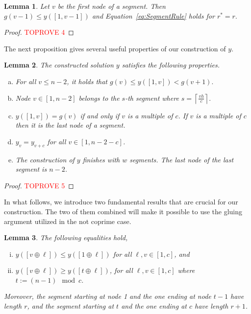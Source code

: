 \documentclass[11pt]{article}
\newtheorem{lemma}{Lemma}[section]
\newcommand\+{\mkern2mu}
\newcommand{\ceil}[1]{\left\lceil #1 \right\rceil}
\begin{document}
 \begin{lemma} Let $v$ be the first node of a segment. Then $g(v-1)\le y([1,v-1])$ and Equation~\eqref{eq:SegmentRule} holds for $r^*=r.$
 \end{lemma}
 \begin{proof}\textcolor{red}{TOPROVE 4}\end{proof}
 
 
 The next proposition gives several useful properties of our construction of $y$. 

 \begin{lemma}    
    The constructed solution $y$ satisfies the following properties.
    \begin{enumerate}[a)]
        \item For all $v \leq  n-2$, it holds that $g(v) \leq y([1,v]) < g(v+1).$ \label{it:a}
         \item Node $v\in [1,n-2]$ belongs to the $s$-th segment where 
          $s=\ceil{\frac{vh}{c}}.$ \label{it:b}
        \item $y([1, v]) = g(v)$ if and only if $v$ is a multiple of $c$. If $v$ is a multiple of $c$ then it is the last node of a segment.\label{it:c}
        \item $y_v=y_{v+c}$ for all $v\in [1,n-2-c]$. \label{it:d}
        \item The construction of $y$ finishes with $w$ segments. The last node of the last segment is $n-2$. \label{it:e}
    \end{enumerate}
    \label{lm:yProperties}
\end{lemma}

\begin{proof}\textcolor{red}{TOPROVE 5}\end{proof}

In what follows, we introduce two fundamental results that are crucial for our construction. The two of them combined will make it possible to use the gluing argument utilized in the not coprime case.

\begin{lemma}
    The following equalities hold,
    \begin{enumerate}[i)]
        \item $y([v \oplus \ell]) \leq y([1\oplus \ell])$ for all $\ell,v\in [1,c]$, and
        \item $y([v \oplus \ell]) \ge y([t\oplus  \ell])$, for all $\ell,v\in [1,c]$ where $t := (n-1) \mod c$.
    \end{enumerate}
    Moreover, the segment starting at node 1 and the one ending at node $t-1$ have length $r$, and the segment starting at $t$ and the one ending at $c$ have length $r+1$.
    \label{lm:yExtrema}
\end{lemma}
\end{document}
